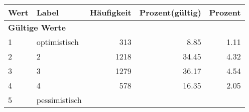      \begin{longtable}{lXrrr}
     \toprule
     \textbf{Wert} & \textbf{Label} & \textbf{Häufigkeit} & \textbf{Prozent(gültig)} & \textbf{Prozent} \\
     \endhead
     \midrule
     \multicolumn{5}{l}{\textbf{Gültige Werte}}\\

     1 &
     \multicolumn{1}{X}{ optimistisch   } &


       \num{313} &
       \num[round-mode=places,round-precision=2]{8,85} &
         \num[round-mode=places,round-precision=2]{1,11} \\

     2 &
     \multicolumn{1}{X}{ 2   } &


       \num{1218} &
       \num[round-mode=places,round-precision=2]{34,45} &
         \num[round-mode=places,round-precision=2]{4,32} \\

     3 &
     \multicolumn{1}{X}{ 3   } &


       \num{1279} &
       \num[round-mode=places,round-precision=2]{36,17} &
         \num[round-mode=places,round-precision=2]{4,54} \\

     4 &
     \multicolumn{1}{X}{ 4   } &


       \num{578} &
       \num[round-mode=places,round-precision=2]{16,35} &
         \num[round-mode=places,round-precision=2]{2,05} \\

     5 &
     \multicolumn{1}{X}{ pessimistisch   } &



\end{longtable}
